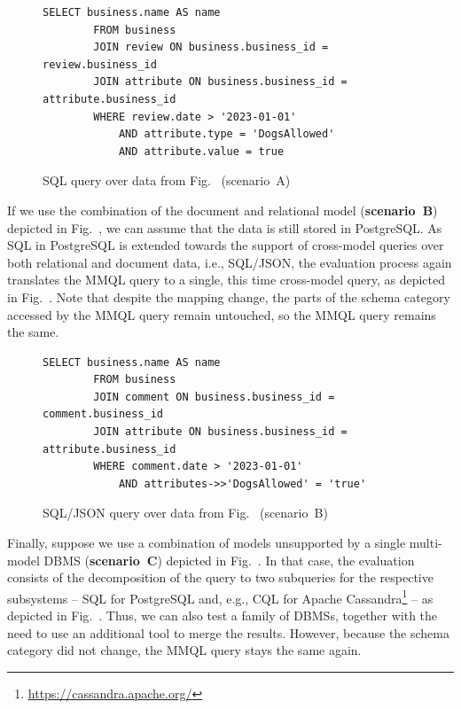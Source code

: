 \begin{figure}[!htb]
    \begin{lstlisting}[language = SQL-fix]
        SELECT business.name AS name
        FROM business
        JOIN review ON business.business_id = review.business_id
        JOIN attribute ON business.business_id = attribute.business_id
        WHERE review.date > '2023-01-01'
            AND attribute.type = 'DogsAllowed'
            AND attribute.value = true
    \end{lstlisting}
    \caption{SQL query over data from Fig.~ (scenario~A)}
\end{figure}

\begin{example}
If we use the combination of the document and relational model (\textbf{scenario~B}) depicted in Fig.~, we can assume that the data is still stored in PostgreSQL. As SQL in PostgreSQL is extended towards the support of cross-model queries over both relational and document data, i.e., SQL/JSON, the evaluation process again translates the MMQL query to a single, this time cross-model query, as depicted in Fig.~. Note that despite the mapping change, the parts of the schema category accessed by the MMQL query remain untouched, so the MMQL query remains the same.
\end{example}

\begin{figure}[!htb]
    \begin{lstlisting}[language = SQL-fix]
        SELECT business.name AS name
        FROM business
        JOIN comment ON business.business_id = comment.business_id
        JOIN attribute ON business.business_id = attribute.business_id
        WHERE comment.date > '2023-01-01'
            AND attributes->>'DogsAllowed' = 'true'
    \end{lstlisting}
    \caption{SQL/JSON query over data from Fig.~ (scenario~B)}
\end{figure}

\begin{example}
Finally, suppose we use a combination of models unsupported by a single multi-model DBMS (\textbf{scenario~C}) depicted in Fig.~. In that case, the evaluation consists of the decomposition of the query to two subqueries for the respective subsystems -- SQL for PostgreSQL and, e.g., CQL for Apache Cassandra\footnote{\url{https://cassandra.apache.org/}} -- as depicted in Fig.~. Thus, we can also test a family of DBMSs, together with the need to use an additional tool to merge the results. However, because the schema category did not change, the MMQL query stays the same again.
\end{example}

